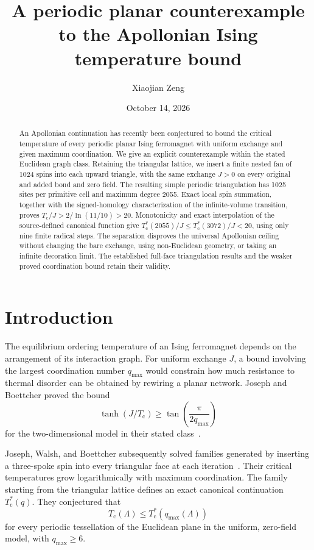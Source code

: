 \documentclass[aps,pre,reprint,amsmath,amssymb,nofootinbib,longbibliography,floatfix]{revtex4-2}
\newcommand{\Tc}{T_{\mathrm c}}
\newcommand{\qm}{q_{\max}}
\begin{document}
\title{A periodic planar counterexample to the Apollonian Ising temperature bound}
\author{Xiaojian Zeng}
\date{October 14, 2026}
\begin{abstract}
An Apollonian continuation has recently been conjectured to bound the critical temperature of every periodic planar Ising ferromagnet with uniform exchange and given maximum coordination. We give an explicit counterexample within the stated Euclidean graph class. Retaining the triangular lattice, we insert a finite nested fan of 1024 spins into each upward triangle, with the same exchange \(J>0\) on every original and added bond and zero field. The resulting simple periodic triangulation has 1025 sites per primitive cell and maximum degree 2055. Exact local spin summation, together with the signed-homology characterization of the infinite-volume transition, proves \(\Tc/J>2/\ln(11/10)>20\). Monotonicity and exact interpolation of the source-defined canonical function give \(\Tc^*(2055)/J\leq\Tc^*(3072)/J<20\), using only nine finite radical steps. The separation disproves the universal Apollonian ceiling without changing the bare exchange, using non-Euclidean geometry, or taking an infinite decoration limit. The established full-face triangulation results and the weaker proved coordination bound retain their validity.
\end{abstract}
\maketitle
\raggedbottom

\section{Introduction}
The equilibrium ordering temperature of an Ising ferromagnet depends on the arrangement of its interaction graph. For uniform exchange \(J\), a bound involving the largest coordination number \(\qm\) would constrain how much resistance to thermal disorder can be obtained by rewiring a planar network. Joseph and Boettcher proved the bound
\begin{equation}
 \tanh(J/\Tc)\geq\tan\!\left(\frac{\pi}{2\qm}\right)
 \label{eq:knownbound}
\end{equation}
for the two-dimensional model in their stated class~\cite{JosephBoettcher2026}.

Joseph, Walsh, and Boettcher subsequently solved families generated by inserting a three-spoke spin into every triangular face at each iteration~\cite{JosephWalshBoettcher2026}. Their critical temperatures grow logarithmically with maximum coordination. The family starting from the triangular lattice defines an exact canonical continuation \(\Tc^*(q)\). They conjectured that
\begin{equation}
 \Tc(\Lambda)\leq\Tc^*(\qm(\Lambda))
 \label{eq:conjecture}
\end{equation}
for every periodic tessellation of the Euclidean plane in the uniform, zero-field model, with \(\qm\geq6\).
\end{document}
